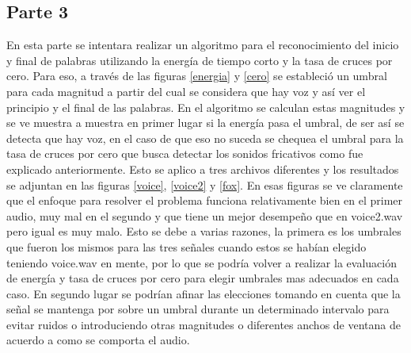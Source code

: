 \documentclass[a4paper]{article}
\begin{document}
\newline
\subsection{Parte 3}
En esta parte se intentara realizar un algoritmo para el reconocimiento del inicio y final de palabras utilizando la energía de tiempo corto y la tasa de cruces por cero. Para eso, a través de las figuras \ref{energia} y \ref{cero} se estableció un umbral para cada magnitud a partir del cual se considera que hay voz y así ver el principio y el final de las palabras. En el algoritmo se calculan estas magnitudes y se ve muestra a muestra en primer lugar si la energía pasa el umbral, de ser así se detecta que hay voz, en el caso de que eso no suceda se chequea el umbral para la tasa de cruces por cero que busca detectar los sonidos fricativos como fue explicado anteriormente. Esto se aplico a tres archivos diferentes y los resultados se adjuntan en las figuras \ref{voice}, \ref{voice2} y \ref{fox}. En esas figuras se ve claramente que el enfoque para resolver el problema funciona relativamente bien en el primer audio, muy mal en el segundo y que tiene un mejor desempeño que en voice2.wav pero igual es muy malo. Esto se debe a varias razones, la primera es los umbrales que fueron los mismos para las tres señales cuando estos se habían elegido teniendo voice.wav en mente, por lo que se podría volver a realizar la evaluación de energía y tasa de cruces por cero para elegir umbrales mas adecuados en cada caso. En segundo lugar se podrían afinar las elecciones tomando en cuenta que la señal se mantenga por sobre un umbral durante un determinado intervalo para evitar ruidos o introduciendo otras magnitudes o diferentes anchos de ventana de acuerdo a como se comporta el audio. 
\end{document}
